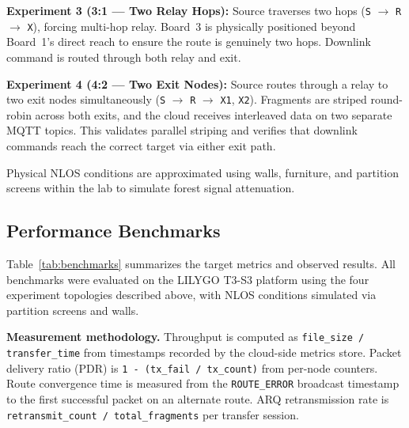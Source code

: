 \documentclass[conference]{IEEEtran}
\begin{document}
\textbf{Experiment 3 (3:1 — Two Relay Hops):} Source traverses two hops (\texttt{S} $\to$ \texttt{R} $\to$ \texttt{X}), forcing multi-hop relay. Board~3 is physically positioned beyond Board~1's direct reach to ensure the route is genuinely two hops. Downlink command is routed through both relay and exit.

\textbf{Experiment 4 (4:2 — Two Exit Nodes):} Source routes through a relay to two exit nodes simultaneously (\texttt{S} $\to$ \texttt{R} $\to$ \texttt{X1}, \texttt{X2}). Fragments are striped round-robin across both exits, and the cloud receives interleaved data on two separate MQTT topics. This validates parallel striping and verifies that downlink commands reach the correct target via either exit path.

Physical NLOS conditions are approximated using walls, furniture, and partition screens within the lab to simulate forest signal attenuation.

\subsection{Performance Benchmarks}

Table~\ref{tab:benchmarks} summarizes the target metrics and observed results. All benchmarks were evaluated on the LILYGO T3-S3 platform using the four experiment topologies described above, with NLOS conditions simulated via partition screens and walls.

\textbf{Measurement methodology.} Throughput is computed as \texttt{file\_size / transfer\_time} from timestamps recorded by the cloud-side metrics store. Packet delivery ratio (PDR) is \texttt{1 - (tx\_fail / tx\_count)} from per-node counters. Route convergence time is measured from the \texttt{ROUTE\_ERROR} broadcast timestamp to the first successful packet on an alternate route. ARQ retransmission rate is \texttt{retransmit\_count / total\_fragments} per transfer session.
\end{document}
